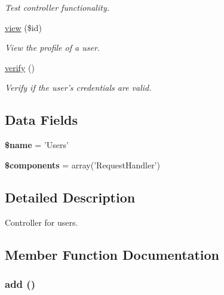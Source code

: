 \begin{DoxyCompactItemize}
\begin{DoxyCompactList}\small\item\em Test controller functionality. \item\end{DoxyCompactList}\item 
\hyperlink{class_users_controller_a93a99cdd06e6a3044ed7e56db0f9419a}{view} (\$id)
\begin{DoxyCompactList}\small\item\em View the profile of a user. \item\end{DoxyCompactList}\item 
\hyperlink{class_users_controller_aa33600b6a1b28d0c4dfe4d468272aaa4}{verify} ()
\begin{DoxyCompactList}\small\item\em Verify if the user's credentials are valid. \item\end{DoxyCompactList}\end{DoxyCompactItemize}
\subsection*{Data Fields}
\begin{DoxyCompactItemize}
\item 
\hypertarget{class_users_controller_ab2fc40d43824ea3e1ce5d86dee0d763b}{
{\bfseries \$name} = 'Users'}
\label{class_users_controller_ab2fc40d43824ea3e1ce5d86dee0d763b}

\item 
\hypertarget{class_users_controller_a2409c247baf67a1d4c6b9a1789cfc088}{
{\bfseries \$components} = array('RequestHandler')}
\label{class_users_controller_a2409c247baf67a1d4c6b9a1789cfc088}

\end{DoxyCompactItemize}


\subsection{Detailed Description}
Controller for users. 

\subsection{Member Function Documentation}
\hypertarget{class_users_controller_a837ba24a1c3095ae67613238d866f79a}{
\subsubsection[{add}]{\setlength{\rightskip}{0pt plus 5cm}add ()}}
\label{class_users_controller_a837ba24a1c3095ae67613238d866f79a}


